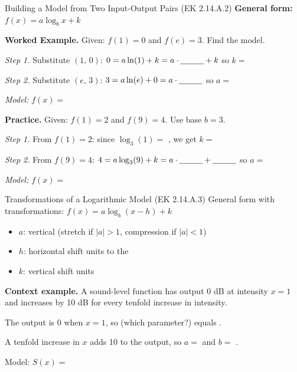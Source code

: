 \documentclass[10pt]{article}
\begin{document}
\begin{notesbox}{Building a Model from Two Input-Output Pairs (EK 2.14.A.2)}
\textbf{General form:} $f(x) = a\log_b x + k$

\vspace{6pt}
\textbf{Worked Example.} Given: $f(1) = 0$ and $f(e) = 3$. Find the model.

\vspace{4pt}
\textit{Step 1.} Substitute $(1,\,0)$: \quad $0 = a\ln(1) + k = a \cdot \blank{1cm} + k$
\quad so $k = $ \blank{1.5cm}

\vspace{4pt}
\textit{Step 2.} Substitute $(e,\,3)$: \quad $3 = a\ln(e) + 0 = a \cdot \blank{1cm}$
\quad so $a = $ \blank{1.5cm}

\vspace{4pt}
\textit{Model:} $f(x) = $ \blank{4cm}

\vspace{8pt}
\textbf{Practice.} Given: $f(1) = 2$ and $f(9) = 4$. Use base $b = 3$.

\vspace{4pt}
\textit{Step 1.} From $f(1) = 2$: since $\log_3(1) = $ \blank{1cm}, we get $k = $ \blank{1.5cm}

\vspace{4pt}
\textit{Step 2.} From $f(9) = 4$: $4 = a\log_3(9) + k = a \cdot \blank{1cm} + \blank{1cm}$
\quad so $a = $ \blank{1.5cm}

\vspace{4pt}
\textit{Model:} $f(x) = $ \blank{4cm}
\end{notesbox}

\vspace{0.08in}

\begin{notesbox}{Transformations of a Logarithmic Model (EK 2.14.A.3)}
General form with transformations: $f(x) = a\log_b(x - h) + k$

\vspace{4pt}
\begin{itemize}[leftmargin=1.5em,itemsep=4pt,topsep=2pt]
  \item $a$: vertical \blank{3cm} (stretch if $|a|>1$, compression if $|a|<1$)
  \item $h$: horizontal shift \blank{1cm} units to the \blank{2cm}
  \item $k$: vertical shift \blank{1cm} units \blank{2cm}
\end{itemize}

\vspace{6pt}
\textbf{Context example.} A sound-level function has output 0 dB at intensity $x = 1$
and increases by 10 dB for every tenfold increase in intensity.

\vspace{4pt}
The output is 0 when $x = 1$, so \blank{3cm} (which parameter?) equals \blank{1cm}.

\vspace{4pt}
A tenfold increase in $x$ adds 10 to the output, so $a = $ \blank{1.5cm} and $b = $ \blank{1.5cm}.

\vspace{4pt}
Model: $S(x) = $ \blank{5cm}
\end{notesbox}
\end{document}
